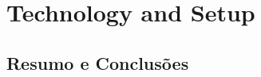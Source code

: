 \chapter{Technology and Setup}
\label{chap:technology}

\section*{}



\section{Resumo e Conclusões}

